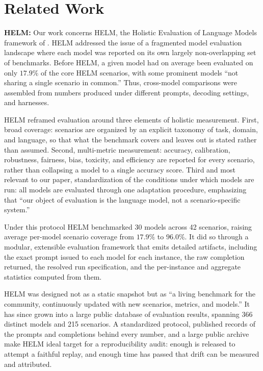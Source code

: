 \section{Related Work}
\label{sec:related}
\textbf{HELM:} Our work concerns HELM, the Holistic Evaluation of Language Models framework of \citet{liang2023holistic}. HELM addressed the issue of a fragmented model evaluation landscape where each model was reported on its own largely non-overlapping set of benchmarks. Before HELM, a given model had on average been evaluated on only $17.9\%$ of the core HELM scenarios, with some prominent models ``not sharing a single scenario in common.'' Thus, cross-model comparisons were assembled from numbers produced under different prompts, decoding settings, and harnesses.

HELM reframed evaluation around three elements of holistic measurement. First, broad coverage: scenarios are organized by an explicit taxonomy of task, domain, and language, so that what the benchmark covers and leaves out is stated rather than assumed. Second, multi-metric measurement: accuracy, calibration, robustness, fairness, bias, toxicity, and efficiency are reported for every scenario, rather than collapsing a model to a single accuracy score. Third and most relevant to our paper, standardization of the conditions under which models are run: all models are evaluated through one adaptation procedure, emphasizing that ``our object of evaluation is the language model, not a scenario-specific system.''

Under this protocol HELM benchmarked 30 models across 42 scenarios, raising average per-model scenario coverage from $17.9\%$ to $96.0\%$. It did so through a modular, extensible evaluation framework that emits detailed artifacts, including the exact prompt issued to each model for each instance, the raw completion returned, the resolved run specification, and the per-instance and aggregate statistics computed from them.

HELM was designed not as a static snapshot but as ``a living benchmark for the community, continuously updated with new scenarios, metrics, and models.'' It has since grown into a large public database of evaluation results, spanning 366 distinct models and 215 scenarios. A standardized protocol, published records of the prompts and completions behind every number, and a large public archive make HELM ideal target for a reproducibility audit: enough is released to attempt a faithful replay, and enough time has passed that drift can be measured and attributed.

